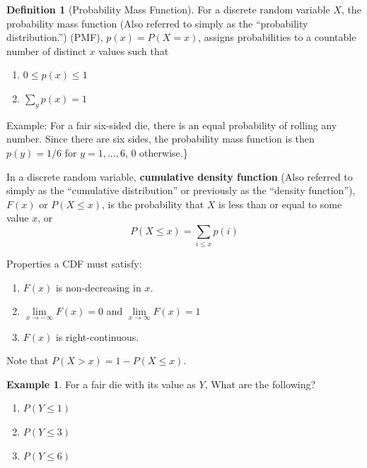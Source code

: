 \documentclass[
]{book}
\providecommand{\tightlist}{%
  \setlength{\itemsep}{0pt}\setlength{\parskip}{0pt}}
\theoremstyle{definition}
\newtheorem{definition}{Definition}[chapter]
\theoremstyle{definition}
\newtheorem{example}{Example}[chapter]
\theoremstyle{definition}
\theoremstyle{definition}
\theoremstyle{remark}
\begin{document}
\begin{definition}[Probability Mass Function]
\protect\hypertarget{def:unnamed-chunk-263}{}{\label{def:unnamed-chunk-263} {} }
For a discrete random variable \(X\), the probability mass function (Also referred to simply as the ``probability distribution.'') (PMF), \(p(x)=P(X=x)\), assigns probabilities to a countable number of distinct \(x\) values such that

\begin{enumerate}
\def\labelenumi{\arabic{enumi}.}
\tightlist
\item
  \(0\le p(x)\le 1\)
\item
  \(\sum\limits_y p(x)=1\)
\end{enumerate}
\end{definition}

Example: For a fair six-sided die, there is an equal probability of rolling any number. Since there are six sides, the probability mass function is then \(p(y)=1/6\) for \(y=1,\ldots,6\), 0 otherwise.\}

In a discrete random variable, \textbf{cumulative density function} (Also referred to simply as the ``cumulative distribution'' or previously as the ``density function''), \(F(x)\) or \(P(X\le x)\), is the probability that \(X\) is less than or equal to some value \(x\), or \[P(X\le x)=\sum\limits_{i\le x} p(i)\]

Properties a CDF must satisfy:

\begin{enumerate}
\def\labelenumi{\arabic{enumi}.}
\tightlist
\item
  \(F(x)\) is non-decreasing in \(x\).
\item
  \(\lim\limits_{x \to -\infty} F(x) = 0\) and \(\lim\limits_{x \to \infty} F(x) = 1\)
\item
  \(F(x)\) is right-continuous.
\end{enumerate}

Note that \(P(X > x) = 1 - P(X \le x)\).

\begin{example}
\protect\hypertarget{exm:unnamed-chunk-264}{}{\label{exm:unnamed-chunk-264} }For a fair die with its value as \(Y\), What are the following?

\begin{enumerate}
\def\labelenumi{\arabic{enumi}.}
\tightlist
\item
  \(P(Y\le 1)\)
\item
  \(P(Y\le 3)\)
\item
  \(P(Y\le 6)\)
\end{enumerate}
\end{example}
\end{document}
